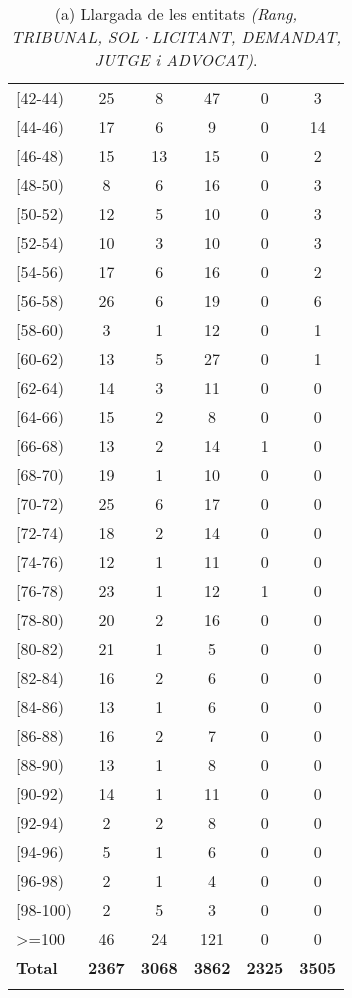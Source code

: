 \begin{table}[H]
\begin{tabular}{|l|ccccc}
        {[}42-44) & 25 & 8 & 47 & 0 & 3 \\
        {[}44-46) & 17 & 6 & 9 & 0 & 14 \\
        {[}46-48) & 15 & 13 & 15 & 0 & 2 \\
        {[}48-50) & 8 & 6 & 16 & 0 & 3 \\
        {[}50-52) & 12 & 5 & 10 & 0 & 3 \\
        {[}52-54) & 10 & 3 & 10 & 0 & 3 \\
        {[}54-56) & 17 & 6 & 16 & 0 & 2 \\
        {[}56-58) & 26 & 6 & 19 & 0 & 6 \\
        {[}58-60) & 3 & 1 & 12 & 0 & 1 \\
        {[}60-62) & 13 & 5 & 27 & 0 & 1 \\
        {[}62-64) & 14 & 3 & 11 & 0 & 0 \\
        {[}64-66) & 15 & 2 & 8 & 0 & 0 \\
        {[}66-68) & 13 & 2 & 14 & 1 & 0 \\
        {[}68-70) & 19 & 1 & 10 & 0 & 0 \\
        {[}70-72) & 25 & 6 & 17 & 0 & 0 \\
        {[}72-74) & 18 & 2 & 14 & 0 & 0 \\
        {[}74-76) & 12 & 1 & 11 & 0 & 0 \\
        {[}76-78) & 23 & 1 & 12 & 1 & 0 \\
        {[}78-80) & 20 & 2 & 16 & 0 & 0 \\
        {[}80-82) & 21 & 1 & 5 & 0 & 0 \\
        {[}82-84) & 16 & 2 & 6 & 0 & 0 \\
        {[}84-86) & 13 & 1 & 6 & 0 & 0 \\
        {[}86-88) & 16 & 2 & 7 & 0 & 0 \\
        {[}88-90) & 13 & 1 & 8 & 0 & 0 \\
        {[}90-92) & 14 & 1 & 11 & 0 & 0 \\
        {[}92-94) & 2 & 2 & 8 & 0 & 0 \\
        {[}94-96) & 5 & 1 & 6 & 0 & 0 \\
        {[}96-98) & 2 & 1 & 4 & 0 & 0 \\
        {[}98-100) & 2 & 5 & 3 & 0 & 0 \\
        \textgreater{}=100 & 46 & 24 & 121 & 0 & 0 \\
        \hline
        \textbf{Total} & \textbf{2367} & \textbf{3068} & \textbf{3862} & \textbf{2325} & \textbf{3505} \\
        \Xhline{2\arrayrulewidth}
    \end{tabular}
    \captionsetup{font=small}
    \caption*{(a) Llargada de les entitats \textit{(Rang, TRIBUNAL, SOL·LICITANT, DEMANDAT, JUTGE i ADVOCAT)}.}
\end{table}

